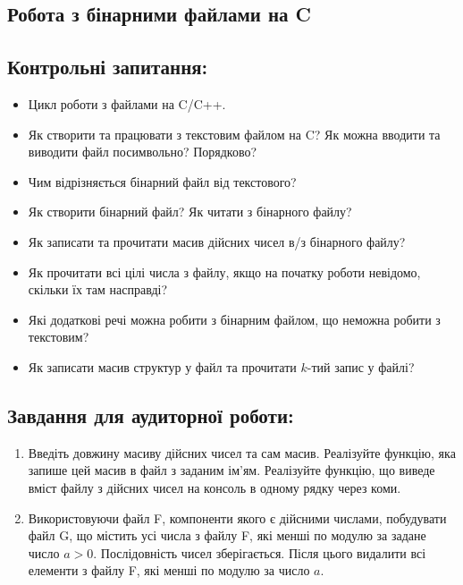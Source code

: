 \documentclass[a5paper,titlepage,openany,twoside,
]
{book_unv}%
\begin{document}
\begin{enumerate}
\chapter{Робота з бінарними файлами на C}
%

\section{Контрольні запитання:}
\begin{itemize}
\item
  Цикл роботи з файлами на C/C++.
\item
  Як створити та працювати з текстовим файлом на C? Як можна вводити та
  виводити файл посимвольно? Порядково?
\item
  Чим відрізняється бінарний файл від текстового? 
\item 
  Як створити бінарний файл? Як читати з бінарного файлу?
\item
  Як записати та прочитати масив дійсних чисел в/з бінарного файлу?
\item
  Як прочитати всі цілі числа з файлу, якщо на початку роботи невідомо,
  скільки їх там насправді?
\item
  Які додаткові речі можна робити з бінарним файлом, що неможна робити з
  текстовим?
\item
  Як записати масив структур у файл та прочитати $k$-тий запис у файлі?
\end{itemize}

\section{Завдання для аудиторної роботи:}

\begin{enumerate}
\def\labelenumi{\arabic{enumi})}

\item
Введіть довжину масиву дійсних чисел та сам масив. Реалізуйте функцію, яка 
запише цей масив в файл з заданим ім'ям. Реалізуйте функцію, що виведе вміст 
файлу з дійсних чисел на консоль в одному рядку через коми. 


\item
  Використовуючи файл F, компоненти якого є дійсними числами, побудувати
  файл G, що містить усі числа з файлу F, які менші по модулю за задане число $a>0$.
  Послідовність чисел зберігається. Після цього видалити всі елементи з файлу F, 
  які менші по модулю за число $a$.


\end{enumerate}
\end{enumerate}
\end{document}

